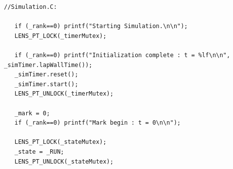 {\small
\begin{lstlisting}
//Simulation.C: 

   if (_rank==0) printf("Starting Simulation.\n\n");                                                          
   LENS_PT_LOCK(_timerMutex);                                                                                 
                                                                                                              
   if (_rank==0) printf("Initialization complete : t = %lf\n\n", _simTimer.lapWallTime());                    
   _simTimer.reset();                                                                                         
   _simTimer.start();                                                                                         
   LENS_PT_UNLOCK(_timerMutex);                                                                               

   _mark = 0;                                                                                                 
   if (_rank==0) printf("Mark begin : t = 0\n\n");                                                            
                                                                                                              
   LENS_PT_LOCK(_stateMutex);                                                                                 
   _state = _RUN;                                                                                             
   LENS_PT_UNLOCK(_stateMutex);                                                                               
                                                                                                              

\end{lstlisting}}
